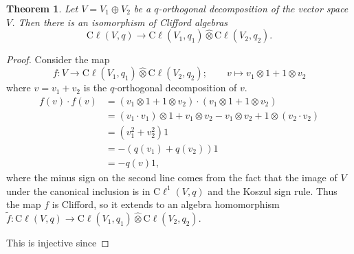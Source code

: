 \documentclass[a4paper,10pt]{scrreprt}
\newcommand{\cliff}{\mathrm{C}\ell}
\theoremstyle{definition}
\theoremstyle{plain}
\newtheorem{theorem}{Theorem}[section]
\theoremstyle{remark}
\begin{document}
\begin{theorem}
  Let $V = V_{1} \oplus V_{2}$ be a $q$-orthogonal decomposition of the vector space $V$. Then there is an isomorphism of Clifford algebras
  \begin{equation*}
    \cliff(V,q) \to \cliff(V_{1}, q_{1}) \hat{\otimes} \cliff(V_{2}, q_{2}).
  \end{equation*}
\end{theorem}
\begin{proof}
  Consider the map 
  \begin{equation*}
    f\colon V \to \cliff(V_{1}, q_{1}) \hat{\otimes} \cliff(V_{2}, q_{2});\qquad v \mapsto v_{1} \otimes 1 + 1 \otimes v_{2}
  \end{equation*}
  where $v = v_{1} + v_{2}$ is the $q$-orthogonal decomposition of $v$.
  \begin{align*}
    f(v) \cdot f(v) &= \left(  v_{1} \otimes 1 + 1 \otimes v_{2}\right)\cdot\left( v_{1} \otimes 1 + 1 \otimes v_{2} \right) \\
    &= (v_{1} \cdot v_{1}) \otimes 1 + v_{1} \otimes v_{2} - v_{1} \otimes v_{2} + 1 \otimes (v_{2} \cdot v_{2}) \\
    &= (v_{1}^{2} + v_{2}^{2})1 \\
    &= -(q(v_{1}) + q(v_{2}))1 \\
    &= -q(v) 1,
  \end{align*}
  where the minus sign on the second line comes from the fact that the image of $V$ under the canonical inclusion is in $\cliff^{1}(V,q)$ and the Koszul sign rule. Thus the map $f$ is Clifford, so it extends to an algebra homomorphism $\tilde{f}\colon \cliff(V, q) \to \cliff(V_{1}, q_{1}) \hat{\otimes} \cliff(V_{2}, q_{2})$.

  This is injective since
\end{proof}
\end{document}
